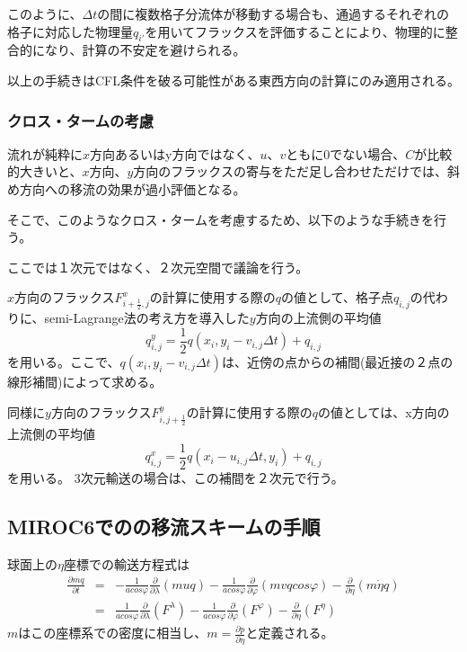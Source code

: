 \documentclass{jsbook}
\begin{document}
  このように、$\Delta t$の間に複数格子分流体が移動する場合も、通過するそれぞれの格子に対応した物理量$q_{i'}$を用いてフラックスを評価することにより、物理的に整合的になり、計算の不安定を避けられる。

  以上の手続きはCFL条件を破る可能性がある東西方向の計算にのみ適用される。

  \subsubsection{クロス・タームの考慮}
  流れが純粋に$x$方向あるいはy方向ではなく、$u、v$ともに0でない場合、$C$が比較的大きいと、$x$方向、$y$方向のフラックスの寄与をただ足し合わせただけでは、斜め方向への移流の効果が過小評価となる。

  そこで、このようなクロス・タームを考慮するため、以下のような手続きを行う。

  ここでは１次元ではなく、２次元空間で議論を行う。
  
  $x$方向のフラックス$F^{x}_{i+\frac{1}{2},j}$の計算に使用する際の$q$の値として、格子点$q_{i,j}$の代わりに、semi-Lagrange法の考え方を導入した$y$方向の上流側の平均値
  \begin{equation}
    q^{y}_{i,j}=\frac{1}{2} {q(x_{i},y_{i}-v_{i,j}\Delta t)+q_{i,j}}
  \end{equation}
  を用いる。ここで、$q(x_{i},y_{i}-v_{i,j}\Delta t)$は、近傍の点からの補間(最近接の２点の線形補間)によって求める。

  同様に$y$方向のフラックス$F^{y}_{i,j+\frac{1}{2}}$の計算に使用する際の$q$の値としては、x方向の上流側の平均値
  \begin{equation}
    q^{x}_{i,j}=\frac{1}{2} {q(x_{i}-u_{i,j}\Delta t,y_{i})+q_{i,j}}
  \end{equation}
  を用いる。
  3次元輸送の場合は、この補間を２次元で行う。

  
\subsection{MIROC6でのの移流スキームの手順}
球面上の$\eta$座標での輸送方程式は
\begin{eqnarray}
  \frac{\partial mq}{\partial t} &=& - \frac{1}{a cos \varphi} \frac{\partial}{\partial \lambda}(muq)- \frac{1}{a cos \varphi} \frac{\partial}{\partial \varphi}(mvq cos \varphi)- \frac{\partial}{\partial \eta} (m \dot{\eta} q)\\
  &=& \frac{1}{a cos \varphi} \frac{\partial}{\partial \lambda}(F^{\lambda})- \frac{1}{a cos \varphi} \frac{\partial}{\partial \varphi}(F^{\varphi})- \frac{\partial}{\partial \eta} (F^{\eta})
\end{eqnarray}
$m$はこの座標系での密度に相当し、$m=\frac{\partial p}{\partial \eta}$と定義される。
\end{document}
